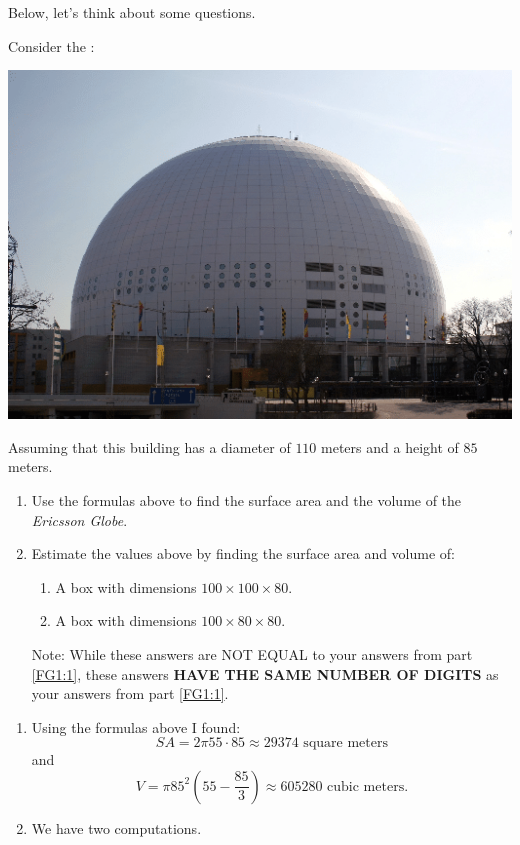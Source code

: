 \documentclass[nooutcomes,noauthor,hints]{ximera}
\begin{document}
Below, let's think about some questions. 


\mynewpage





\begin{question}
  Consider the :
   \begin{center}
    \includegraphics[width=.4\textwidth]{dome.png} %
   \end{center}
   Assuming that this building has a diameter of $110$ meters and a
   height of $85$ meters.
   \begin{enumerate}
   \item \label{FG1:1} Use the formulas above to find the surface area
     and the volume of the \textit{Ericsson Globe}.
   \item Estimate the values above by finding the surface area and
     volume of:
     \begin{enumerate}
     \item A box with dimensions $100\times 100 \times 80$.
     \item A box with dimensions $100\times 80 \times 80$.
     \end{enumerate}
   Note: While these answers are NOT EQUAL to your answers from
   part \ref{FG1:1}, these answers \textbf{HAVE THE SAME NUMBER OF
     DIGITS} as your answers from part \ref{FG1:1}.
   \end{enumerate}
   \begin{freeResponse}
     \begin{enumerate}
     \item Using the formulas above I found:
       \[
       SA = 2\pi 55\cdot 85 \approx 29374 \text{ square meters}
       \]
       and
       \[
       V = \pi85^2 \left(55-\frac{85}{3}\right)\approx  605280 \text{ cubic meters}.
       \]
     \item We have two computations.
       \begin{enumerate}

\end{enumerate}
\end{enumerate}
\end{freeResponse}
\end{question}
\end{document}
